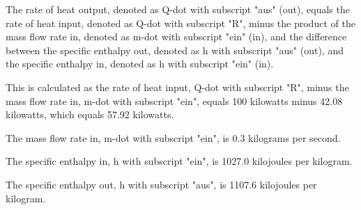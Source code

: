 The rate of heat output, denoted as Q-dot with subscript "aus" (out), equals the rate of heat input, denoted as Q-dot with subscript "R", minus the product of the mass flow rate in, denoted as m-dot with subscript "ein" (in), and the difference between the specific enthalpy out, denoted as h with subscript "aus" (out), and the specific enthalpy in, denoted as h with subscript "ein" (in).

This is calculated as the rate of heat input, Q-dot with subscript "R", minus the mass flow rate in, m-dot with subscript "ein", equals 100 kilowatts minus 42.08 kilowatts, which equals 57.92 kilowatts.

The mass flow rate in, m-dot with subscript "ein", is 0.3 kilograms per second.

The specific enthalpy in, h with subscript "ein", is 1027.0 kilojoules per kilogram.

The specific enthalpy out, h with subscript "aus", is 1107.6 kilojoules per kilogram.